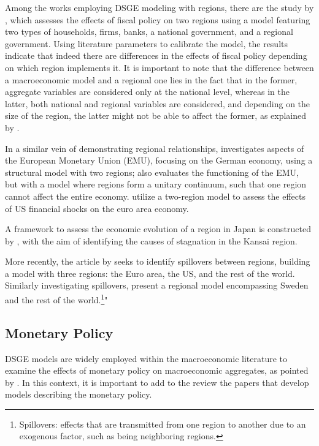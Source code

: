 \documentclass[
	thesis.tex
	]{subfiles}
\begin{document}
	Among the works employing DSGE modeling with regions, there are the study by \textcite{tamegawa_two-region_2012}, which assesses the effects of fiscal policy on two regions using a model featuring two types of households, firms, banks, a national government, and a regional government. Using literature parameters to calibrate the model, the results indicate that indeed there are differences in the effects of fiscal policy depending on which region implements it. It is important to note that the difference between a macroeconomic model and a regional one lies in the fact that in the former, aggregate variables are considered only at the national level, whereas in the latter, both national and regional variables are considered, and depending on the size of the region, the latter might not be able to affect the former, as explained by \textcite{tamegawa_constructing_2013}.
	
	In a similar vein of demonstrating regional relationships, \textcite{pytlarczyk_estimated_2005} investigates aspects of the European Monetary Union (EMU), focusing on the German economy, using a structural model with two regions; \textcite{gali_optimal_2005} also evaluates the functioning of the EMU, but with a model where regions form a unitary continuum, such that one region cannot affect the entire economy. \textcite{alpanda_international_2014} utilize a two-region model to assess the effects of US financial shocks on the euro area economy.
	
	A framework to assess the economic evolution of a region in Japan is constructed by \textcite{okano_development_2015}, with the aim of identifying the causes of stagnation in the Kansai region.
	
	More recently, the article by \textcite{croitorov_financial_2020} seeks to identify spillovers between regions, building a model with three regions: the Euro area, the US, and the rest of the world. Similarly investigating spillovers, \textcite{corbo_maja_2020} present a regional model encompassing Sweden and the rest of the world.\footnote{ Spillovers: effects that are transmitted from one region to another due to an exogenous factor, such as being neighboring regions.}"
	
	\subsection*{Monetary Policy}
	
	DSGE models are widely employed within the macroeconomic literature to examine the effects of monetary policy on macroeconomic aggregates, as pointed by \textcite{gali_monetary_2015}. In this context, it is important to add to the review the papers that develop models describing the monetary policy.
	
\end{document}
